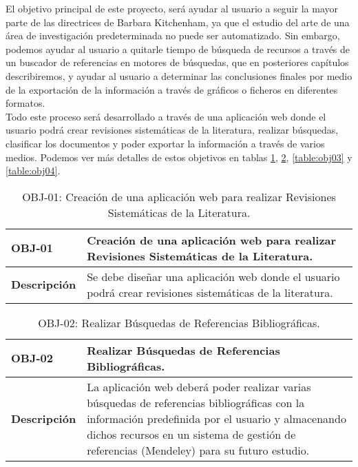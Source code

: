 El objetivo principal de este proyecto, será ayudar al usuario a seguir la mayor parte de las directrices de Barbara Kitchenham, ya que el estudio del arte de una área de investigación predeterminada no puede ser automatizado. Sin embargo, podemos ayudar al usuario a quitarle tiempo de búsqueda de recursos a través de un buscador de referencias en motores de búsquedas, que en posteriores capítulos describiremos, y ayudar al usuario a determinar las conclusiones finales por medio de la exportación de la información a través de gráficos o ficheros en diferentes formatos.\\

Todo este proceso será desarrollado a través de una aplicación web donde el usuario podrá crear revisiones sistemáticas de la literatura, realizar búsquedas, clasificar los documentos y poder exportar la información a través de varios medios. Podemos ver más detalles de estos objetivos en tablas \ref{table:obj01}, \ref{table:obj02}, \ref{table:obj03} y \ref{table:obj04}.

\begin{table}[!hbt]
	\begin{center}
		\begin{tabular}{|p{3cm}|p{12cm}|}
			\hline
			\textbf{OBJ-01} & Creación de una aplicación web para realizar Revisiones Sistemáticas de la Literatura.\\
			\hline
			\textbf{Descripción} & Se debe diseñar una aplicación web donde el usuario podrá crear revisiones sistemáticas de la literatura.\\
			\hline
		\end{tabular}
		\caption{OBJ-01: Creación de una aplicación web para realizar Revisiones Sistemáticas de la Literatura.}
		\label{table:obj01}
	\end{center}
\end{table}

\begin{table}[!hbt]
	\begin{center}
		\begin{tabular}{|p{3cm}|p{12cm}|}
			\hline
			\textbf{OBJ-02} & Realizar Búsquedas de Referencias Bibliográficas.\\
			\hline
			\textbf{Descripción} & La aplicación web deberá poder realizar varias búsquedas de referencias bibliográficas con la información predefinida por el usuario y almacenando dichos recursos en un sistema de gestión de referencias (Mendeley) para su futuro estudio.\\
			\hline
		\end{tabular}
		\caption{OBJ-02: Realizar Búsquedas de Referencias Bibliográficas.}
		\label{table:obj02}
	\end{center}
\end{table}

